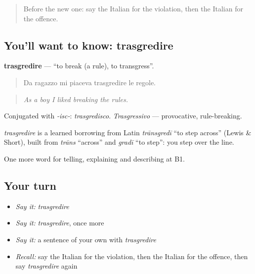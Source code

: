 \begin{quote}
Before the new one: say the Italian for the violation, then the Italian for the offence.
\end{quote}

\subsection*{You'll want to know: trasgredire}
\textbf{trasgredire} — \textquotedblleft{}to break (a rule), to transgress\textquotedblright{}.

\begin{quote}
Da ragazzo mi piaceva trasgredire le regole.
\end{quote}

\begin{quote}
\emph{As a boy I liked breaking the rules.}
\end{quote}

Conjugated with \emph{-isc-}: \emph{trasgredisco}. \emph{Trasgressivo} — provocative, rule-breaking.

\begin{cousinweb}
\emph{trasgredire} is a learned borrowing from Latin \emph{trānsgredī} \textquotedblleft{}to step across\textquotedblright{} (Lewis \& Short), built from \emph{trāns} \textquotedblleft{}across\textquotedblright{} and \emph{gradī} \textquotedblleft{}to step\textquotedblright{}: you step over the line.
\end{cousinweb}

\begin{grammarlens}[title={What you've built}]
One more word for telling, explaining and describing at B1.
\end{grammarlens}

\subsection*{Your turn}
\begin{itemize}
\raggedright
  \item \emph{Say it:} \emph{trasgredire}
  \item \emph{Say it:} \emph{trasgredire}, once more
  \item \emph{Say it:} a sentence of your own with \emph{trasgredire}
  \item \emph{Recall:} say the Italian for the violation, then the Italian for the offence, then say \emph{trasgredire} again
\end{itemize}

